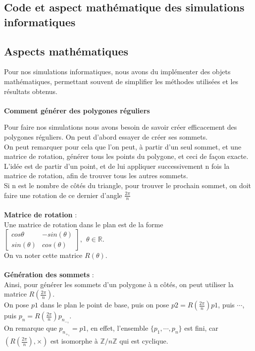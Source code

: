 \documentclass{book}
\begin{document}
\begin{appendices}
\chapter{Code et aspect mathématique des simulations informatiques}

\section{Aspects mathématiques}

Pour nos simulations informatiques, nous avons du implémenter des objets mathématiques, permettant souvent de simplifier les méthodes utilisées et les résultats obtenus.\\\\

{\noindent \Large\textbf{Comment générer des polygones réguliers \\}}

{\noindent Pour faire nos simulations nous avons besoin de savoir créer efficacement des polygones réguliers.
On peut d'abord essayer de créer ses sommets.}\\
On peut remarquer pour cela que l'on peut, à partir d'un seul sommet, et une matrice de rotation, générer tous les points du polygone, et ceci de façon exacte.
L'idée est de partir d'un point, et de lui appliquer successivement n fois la matrice de rotation, afin de trouver tous les autres sommets.\\
Si n est le nombre de côtés du triangle, pour trouver le prochain sommet, on doit faire une rotation de ce dernier d'angle $\frac{2 \pi}{n}$\\\\
\textbf{Matrice de rotation } : \\
Une matrice de rotation dans le plan est de la forme $\begin{bmatrix} cos{\theta} & -sin(\theta) \\ sin(\theta) & cos(\theta) \end{bmatrix}, ~~\theta \in \mathbb{R}$. \\
On va noter cette matrice $R(\theta)$. \\\\
\textbf{Génération des sommets } :\\
Ainsi, pour générer les sommets d'un polygone à n côtés, on peut utiliser la matrice $R( \frac{2 \pi}{n})$. \\
On pose $p1$ dans le plan le point de base, puis on pose $p2 = R( \frac{2 \pi}{n})p1$, puis $\cdots$, puis $p_n = R( \frac{2 \pi}{n}) p_n_-_1$. \\
On remarque que $p_n_+_1 = p1$, en effet, l'ensemble $\{ p_1, \cdots, p_n\}$ est fini, car $(R(\frac{2 \pi}{n}), \times)$ est isomorphe à $\mathbb{Z}/n\mathbb{Z}$ qui est cyclique. 



\end{appendices}
\end{document}
